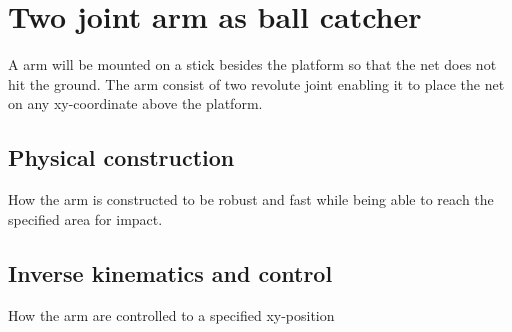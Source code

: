 \chapter{Two joint arm as ball catcher}
\label{catcherArm}
A arm will be mounted on a stick besides the platform so that the net does not hit the ground. The arm consist of two revolute joint enabling it to place the net on any xy-coordinate above the platform.

\section{Physical construction}
\label{armConstruction}
How the arm is constructed to be robust and fast while being able to reach the specified area for impact.


\section{Inverse kinematics and control }
\label{kinematics}
How the arm are controlled to a specified xy-position
